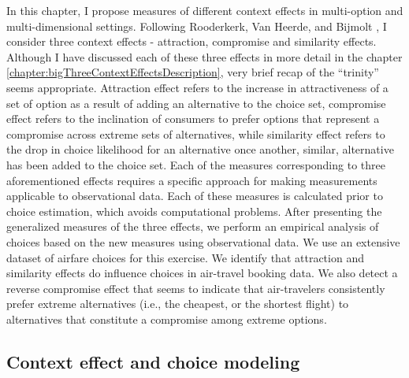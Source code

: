 \documentclass[a4paper,12pt]{article}
\newcommand{\citeyearonly}[1]{\citeyearpar{#1}}
\begin{document}
In this chapter, I propose measures of different context effects in multi-option and multi-dimensional settings. Following Rooderkerk, Van Heerde, and Bijmolt \citeyearonly{roodrkerkEtAl11}, I consider three context effects - attraction, compromise and similarity effects. Although I have discussed each of these three effects in more detail in the chapter \ref{chapter:bigThreeContextEffectsDescription}, very brief recap of the ``trinity'' seems appropriate. Attraction effect refers to the increase in attractiveness of a set of option as a result of adding an alternative to the choice set, compromise effect refers to the inclination of consumers to prefer options that represent a compromise across extreme sets of alternatives, while similarity effect refers to the drop in choice likelihood for an alternative once another, similar, alternative has been added to the choice set. Each of the measures corresponding to three aforementioned effects requires a specific approach for making measurements applicable to observational data. Each of these measures is calculated prior to choice estimation, which avoids computational problems. After presenting the generalized measures of the three effects, we perform an empirical analysis of choices based on the new measures using observational data. We use an extensive dataset of airfare choices for this exercise. We identify that attraction and similarity effects do influence choices in air-travel booking data. We also detect a reverse compromise effect that seems to indicate that air-travelers consistently prefer extreme alternatives (i.e., the cheapest, or the shortest flight) to alternatives that constitute a compromise among extreme options.

\subsection{Context effect and choice modeling}
\end{document}
